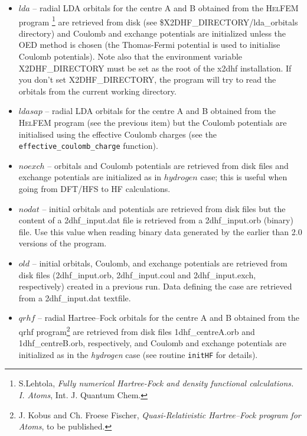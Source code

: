 \documentclass[10pt,a4paper]{article}
\newcommand{\ft}[1]{\texttt{#1}}
\begin{document}
\begin{description}
\begin{description}
\begin{itemize}
\item $lda$ -- radial LDA orbitals for the centre A and B obtained from the
  \textsc{HelFEM} program%
  \footnote{S.Lehtola, \textsl{Fully numerical Hartree-Fock and density
      functional calculations. I. Atoms}, Int. J. Quantum
    Chem. } are retrieved from disk (see
  \$X2DHF\_DI\-REC\-TO\-RY/\-lda\_orbitals directory) and Coulomb and
  exchange potentials are initialized unless the OED method is chosen (the
  Thomas-Fermi potential is used to initialise Coulomb potentials). Note
  also that the environment variable X2DHF\_DIRECTORY must be set as the
  root of the x2dhf installation. If you don't set X2DHF\_DIRECTORY, the
  program will try to read the orbitals from the current working directory.

\item $ldasap$ -- radial LDA orbitals for the centre A and B obtained from
  the \textsc{HelFEM} program (see the previous item) but the Coulomb
  potentials are initialised using the effective Coulomb charges (see the
  \ft{effective\_coulomb\_charge} function).
  
\item $noexch$ -- orbitals and Coulomb potentials are retrieved from disk
  files and exchange potentials are initialized as in $hydrogen$ case; this
  is useful when going from DFT/HFS to HF calculations.

\item $nodat$ -- initial orbitals and potentials are retrieved from disk
  files but the content of a 2dhf\_input.dat file is retrieved from a
  2dhf\_input.orb (binary) file. Use this value when reading binary data
  generated by the earlier than 2.0 versions of the program.

\item $old$ -- initial orbitals, Coulomb, and exchange potentials are
  retrieved from disk files (2dhf\_\-input.\-orb, 2dhf\_\-input.\-coul and
  2dhf\_input.exch, respectively) created in a previous run. Data defining
  the case are retrieved from a 2dhf\_input.\-dat textfile.


\item $qrhf$ -- radial Hartree--Fock orbitals for the centre A and B
  obtained from the qrhf program\footnote{J. Kobus and Ch. Froese Fischer,
    \textsl{Quasi-Relativistic Hartree--Fock program for Atoms}, to be
    published.}  are retrieved from disk files 1dhf\-\_centreA.\-orb and
  1dhf\-\_centreB.\-orb, respectively, and Coulomb and exchange potentials
  are initialized as in the \textsl{hydrogen} case (see routine \ft{initHF}
  for details).
\end{itemize}


\end{description}
\end{description}
\end{document}
